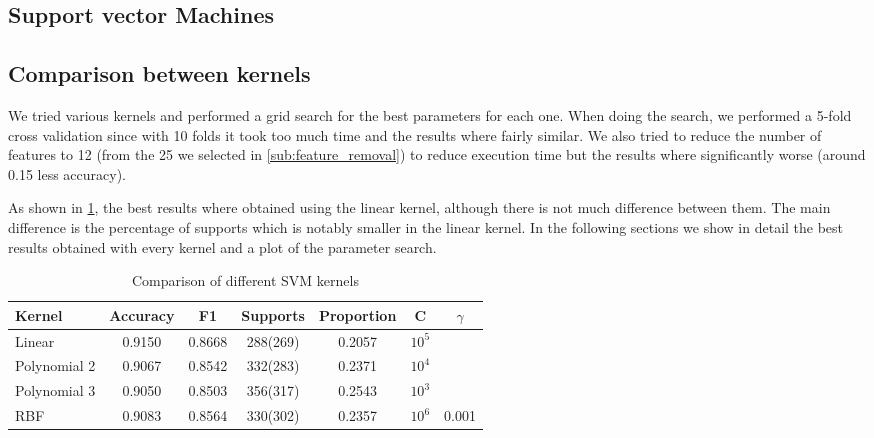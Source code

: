 
\subsection{Support vector Machines}%
\label{sub:svm}

\subsection{Comparison between kernels}

We tried various kernels and performed a grid search for the best parameters for each one. When doing the search, we
performed a 5-fold cross validation since with 10 folds it took too much time and the results where fairly similar.
We also tried to reduce the number of features to 12 (from the 25 we selected in \cref{sub:feature_removal}) to reduce
execution time but the results where significantly worse (around 0.15 less accuracy).


As shown in \cref{tab:svm_comp}, the best results where obtained using the linear kernel, although there is not
much difference between them. The main difference is the percentage of supports which is notably smaller in the
linear kernel. In the following sections we show in detail the best results obtained with every kernel and a plot of the parameter search.


\begin{table}[H]
\centering
\caption{Comparison of different SVM kernels}%
\label{tab:svm_comp}

\begin{tabular}{lcccccc}
\toprule
Kernel       & Accuracy & F1 & Supports & Proportion & C & $\gamma$ \\
\midrule
Linear       & 0.9150 & 0.8668 & 288(269) & 0.2057 & $10^5$\\
Polynomial 2 & 0.9067 & 0.8542 & 332(283) & 0.2371 & $10^4$\\
Polynomial 3 & 0.9050 & 0.8503 & 356(317) & 0.2543 & $10^3$\\
RBF          & 0.9083 & 0.8564 & 330(302) & 0.2357 & $10^6$ & 0.001\\
\bottomrule
\end{tabular}
\end{table}

